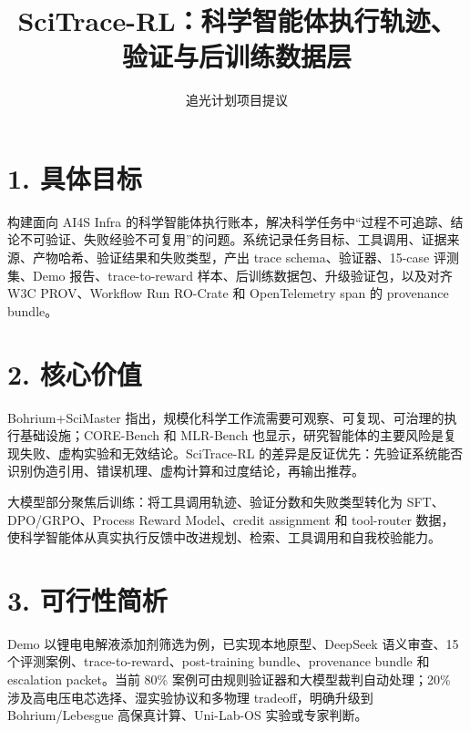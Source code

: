 \documentclass[11pt,fontset=fandol]{ctexart}
\title{\textbf{SciTrace-RL：科学智能体执行轨迹、验证与后训练数据层}}
\author{追光计划项目提议}
\date{}
\begin{document}
\maketitle

\section*{1. 具体目标}

构建面向 AI4S Infra 的科学智能体执行账本，解决科学任务中“过程不可追踪、结论不可验证、失败经验不可复用”的问题。系统记录任务目标、工具调用、证据来源、产物哈希、验证结果和失败类型，产出 trace schema、验证器、15-case 评测集、Demo 报告、trace-to-reward 样本、后训练数据包、升级验证包，以及对齐 W3C PROV、Workflow Run RO-Crate 和 OpenTelemetry span 的 provenance bundle。

\section*{2. 核心价值}

Bohrium+SciMaster 指出，规模化科学工作流需要可观察、可复现、可治理的执行基础设施\cite{bohrium_scimaster}；CORE-Bench 和 MLR-Bench 也显示，研究智能体的主要风险是复现失败、虚构实验和无效结论\cite{corebench,mlrbench}。SciTrace-RL 的差异是反证优先：先验证系统能否识别伪造引用、错误机理、虚构计算和过度结论，再输出推荐。

大模型部分聚焦后训练：将工具调用轨迹、验证分数和失败类型转化为 SFT、DPO/GRPO、Process Reward Model、credit assignment 和 tool-router 数据，使科学智能体从真实执行反馈中改进规划、检索、工具调用和自我校验能力。

\section*{3. 可行性简析}

Demo 以锂电电解液添加剂筛选为例，已实现本地原型、DeepSeek 语义审查、15 个评测案例、trace-to-reward、post-training bundle、provenance bundle 和 escalation packet。当前 80\% 案例可由规则验证器和大模型裁判自动处理；20\% 涉及高电压电芯选择、湿实验协议和多物理 tradeoff，明确升级到 Bohrium/Lebesgue 高保真计算、Uni-Lab-OS 实验或专家判断\cite{dp_about,unilabos}。
\end{document}
